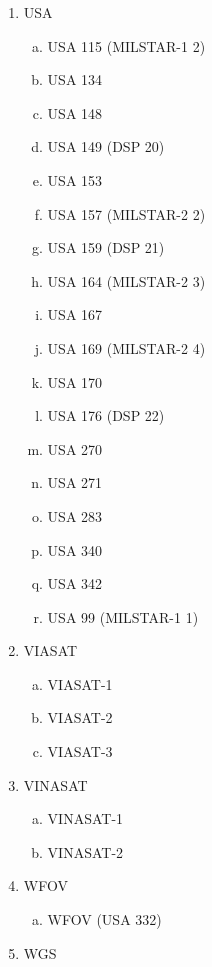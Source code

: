 \begin{multicols}{2}
\begin{enumerate}
\begin{enumerate}[a.]
    \item UFO 10 (USA 146)
    \item UFO 11 (USA 174)
    \item UFO 2 (USA 95)
    \item UFO 4 (USA 108)
  \end{enumerate}
  \item USA
  \begin{enumerate}[a.]
    \item USA 115 (MILSTAR-1 2)
    \item USA 134
    \item USA 148
    \item USA 149 (DSP 20)
    \item USA 153
    \item USA 157 (MILSTAR-2 2)
    \item USA 159 (DSP 21)
    \item USA 164 (MILSTAR-2 3)
    \item USA 167
    \item USA 169 (MILSTAR-2 4)
    \item USA 170
    \item USA 176 (DSP 22)
    \item USA 270
    \item USA 271
    \item USA 283
    \item USA 340
    \item USA 342
    \item USA 99 (MILSTAR-1 1)
  \end{enumerate}
  \item VIASAT
  \begin{enumerate}[a.]
    \item VIASAT-1
    \item VIASAT-2
    \item VIASAT-3
  \end{enumerate}
  \item VINASAT
  \begin{enumerate}[a.]
    \item VINASAT-1
    \item VINASAT-2
  \end{enumerate}
  \item WFOV
  \begin{enumerate}[a.]
    \item WFOV (USA 332)
  \end{enumerate}
  \item WGS
  \begin{enumerate}[a.]

\end{enumerate}
\end{enumerate}
\end{multicols}
